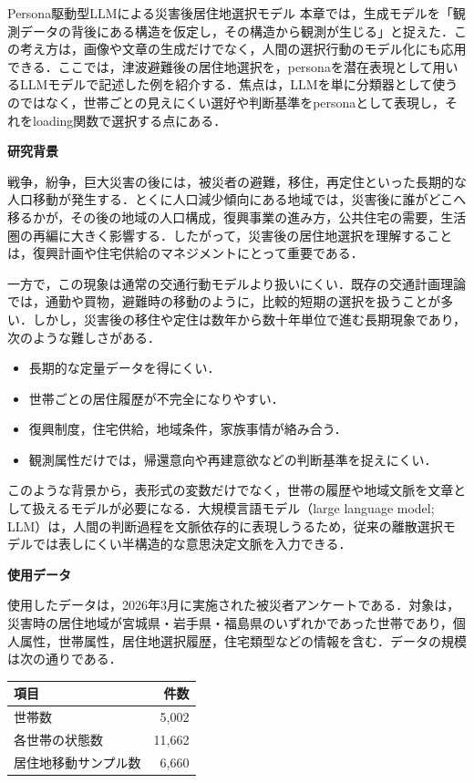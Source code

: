 \clearpage
\begin{column}{Persona駆動型LLMによる災害後居住地選択モデル}
本章では，生成モデルを「観測データの背後にある構造を仮定し，その構造から観測が生じる」と捉えた．この考え方は，画像や文章の生成だけでなく，人間の選択行動のモデル化にも応用できる．ここでは，津波避難後の居住地選択を，personaを潜在表現として用いるLLMモデルで記述した例を紹介する．焦点は，LLMを単に分類器として使うのではなく，世帯ごとの見えにくい選好や判断基準をpersonaとして表現し，それをloading関数で選択する点にある．

\medskip
\noindent
\textbf{研究背景}

戦争，紛争，巨大災害の後には，被災者の避難，移住，再定住といった長期的な人口移動が発生する．とくに人口減少傾向にある地域では，災害後に誰がどこへ移るかが，その後の地域の人口構成，復興事業の進み方，公共住宅の需要，生活圏の再編に大きく影響する．したがって，災害後の居住地選択を理解することは，復興計画や住宅供給のマネジメントにとって重要である．

一方で，この現象は通常の交通行動モデルより扱いにくい．既存の交通計画理論では，通勤や買物，避難時の移動のように，比較的短期の選択を扱うことが多い．しかし，災害後の移住や定住は数年から数十年単位で進む長期現象であり，次のような難しさがある．

\begin{itemize}
\item 長期的な定量データを得にくい．
\item 世帯ごとの居住履歴が不完全になりやすい．
\item 復興制度，住宅供給，地域条件，家族事情が絡み合う．
\item 観測属性だけでは，帰還意向や再建意欲などの判断基準を捉えにくい．
\end{itemize}

このような背景から，表形式の変数だけでなく，世帯の履歴や地域文脈を文章として扱えるモデルが必要になる．大規模言語モデル（large language model; LLM）は，人間の判断過程を文脈依存的に表現しうるため，従来の離散選択モデルでは表しにくい半構造的な意思決定文脈を入力できる．

\medskip
\noindent
\textbf{使用データ}

使用したデータは，2026年3月に実施された被災者アンケートである．対象は，災害時の居住地域が宮城県・岩手県・福島県のいずれかであった世帯であり，個人属性，世帯属性，居住地選択履歴，住宅類型などの情報を含む．データの規模は次の通りである．

\begin{center}
\scriptsize
\begin{tabular}{lr}
\toprule
項目 & 件数 \\
\midrule
世帯数 & 5,002 \\
各世帯の状態数 & 11,662 \\
居住地移動サンプル数 & 6,660 \\
\bottomrule
\end{tabular}
\end{center}


\end{column}
